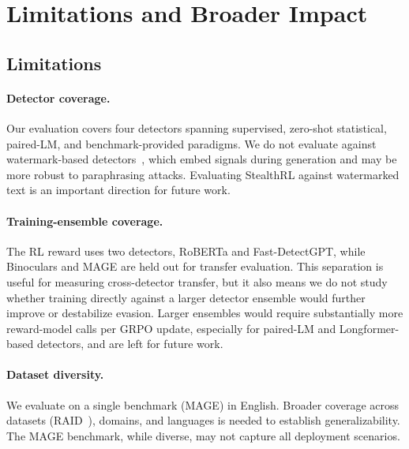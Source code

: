 \documentclass[11pt]{article}
\begin{document}
\section{Limitations and Broader Impact}
\label{sec:limitations}

\subsection{Limitations}

\paragraph{Detector coverage.} Our evaluation covers four detectors spanning supervised, zero-shot statistical, paired-LM, and benchmark-provided paradigms. We do not evaluate against watermark-based detectors~\cite{kirchenbauer2023watermark}, which embed signals during generation and may be more robust to paraphrasing attacks. Evaluating StealthRL against watermarked text is an important direction for future work.

\paragraph{Training-ensemble coverage.} The RL reward uses two detectors, RoBERTa and Fast-DetectGPT, while Binoculars and MAGE are held out for transfer evaluation. This separation is useful for measuring cross-detector transfer, but it also means we do not study whether training directly against a larger detector ensemble would further improve or destabilize evasion. Larger ensembles would require substantially more reward-model calls per GRPO update, especially for paired-LM and Longformer-based detectors, and are left for future work.

\paragraph{Dataset diversity.} We evaluate on a single benchmark (MAGE) in English. Broader coverage across datasets (RAID~\cite{dugan2024raidsharedbenchmarkrobust}), domains, and languages is needed to establish generalizability. The MAGE benchmark, while diverse, may not capture all deployment scenarios.
\end{document}
